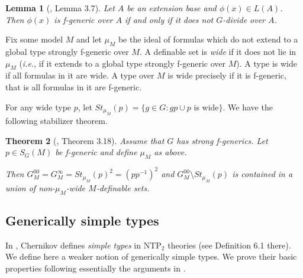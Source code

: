 \documentclass{amsart}
\numberwithin{equation}{section}
\newtheorem{thm}{Theorem}[section]
\newtheorem{lemme}[thm]{Lemma}
\theoremstyle{definition}
\theoremstyle{mystyle}
\theoremstyle{remark}
\begin{document}
\begin{lemme}[\cite{PRC}, Lemma 3.7]\label{lem_fund1}
Let $A$ be an extension base and $\phi(x)\in L(A)$. Then $\phi(x)$ is f-generic over $A$ if and only if it does not $G$-divide over $A$.
\end{lemme}

Fix some model $M$ and let $\mu_M$ be the ideal of formulas which do not extend to a global type strongly f-generic over $M$. A definable set is \emph{wide} if it does not lie in $\mu_M$ ({\it i.e.}, if it extends to a global type strongly f-generic over $M$). A type is wide if all formulas in it are wide. A type over $M$ is wide precisely if it is f-generic, that is all formulas in it are f-generic.

For any wide type $p$, let $St_{\mu_M}(p) = \{g\in G : gp \cup p$ is wide$\}$. We have the following stabilizer theorem.

\begin{thm}[\cite{PRC}, Theorem 3.18]\label{th_stab}
Assume that $G$ has strong f-generics. Let $p\in S_G(M)$ be f-generic and define $\mu_M$ as above.

Then $G^{00}_M=G^{\infty}_M=St_{\mu_M}(p)^2=(pp^{-1})^2$ and $G^{00}_M\setminus St_{\mu_M}(p)$ is contained in a union of non-$\mu_M$-wide $M$-definable sets.
\end{thm}


\subsection{Generically simple types}

In \cite{CherNTP}, Chernikov defines \emph{simple types} in NTP$_2$ theories (see Definition 6.1 there). We define here a weaker notion of generically simple types. We prove their basic properties following essentially the arguments in \cite{CherNTP}.
\end{document}
